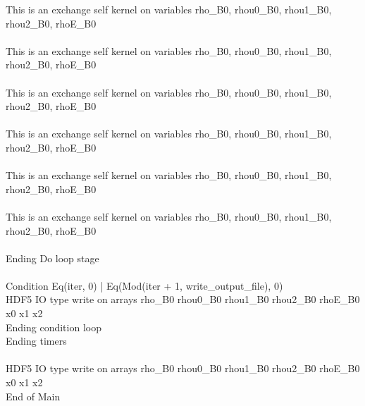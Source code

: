 \documentclass{article}
\begin{document}
\noindent This is an exchange self kernel on variables rho_B0, rhou0_B0, rhou1_B0, rhou2_B0, rhoE_B0\\\\\noindent This is an exchange self kernel on variables rho_B0, rhou0_B0, rhou1_B0, rhou2_B0, rhoE_B0\\\\\noindent This is an exchange self kernel on variables rho_B0, rhou0_B0, rhou1_B0, rhou2_B0, rhoE_B0\\\\\noindent This is an exchange self kernel on variables rho_B0, rhou0_B0, rhou1_B0, rhou2_B0, rhoE_B0\\\\\noindent This is an exchange self kernel on variables rho_B0, rhou0_B0, rhou1_B0, rhou2_B0, rhoE_B0\\\\\noindent This is an exchange self kernel on variables rho_B0, rhou0_B0, rhou1_B0, rhou2_B0, rhoE_B0\\\\\noindent Ending Do loop stage\\
\\\noindent Condition Eq(iter, 0) | Eq(Mod(iter + 1, write_output_file), 0)\\\noindent HDF5 IO type write on arrays rho_B0 rhou0_B0 rhou1_B0 rhou2_B0 rhoE_B0 x0 x1 x2\\\noindent Ending condition loop %
\\\noindent Ending timers\\
\\\noindent HDF5 IO type write on arrays rho_B0 rhou0_B0 rhou1_B0 rhou2_B0 rhoE_B0 x0 x1 x2\\\noindent End of Main\\
\end{document}

